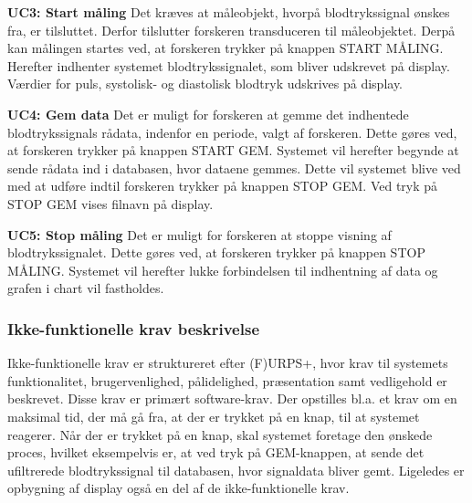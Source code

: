 \textbf{UC3: Start måling}
Det kræves at måleobjekt, hvorpå blodtrykssignal ønskes fra, er tilsluttet. Derfor tilslutter forskeren transduceren til måleobjektet. Derpå kan målingen startes ved, at forskeren trykker på knappen START MÅLING. Herefter indhenter systemet blodtrykssignalet, som bliver udskrevet på display. Værdier for puls, systolisk- og diastolisk blodtryk udskrives på display. 

\textbf{UC4: Gem data}
Det er muligt for forskeren at gemme det indhentede blodtrykssignals rådata, indenfor en periode, valgt af forskeren. Dette gøres ved, at forskeren trykker på knappen START GEM. Systemet vil herefter begynde at sende rådata ind i databasen, hvor dataene gemmes. Dette vil systemet blive ved med at udføre indtil forskeren trykker på knappen STOP GEM. Ved tryk på STOP GEM vises filnavn på display. 

\textbf{UC5: Stop måling}
Det er muligt for forskeren at stoppe visning af blodtrykssignalet. Dette gøres ved, at forskeren trykker på knappen STOP MÅLING. Systemet vil herefter lukke forbindelsen til indhentning af data og grafen i chart vil fastholdes. 

\subsubsection{Ikke-funktionelle krav beskrivelse}
Ikke-funktionelle krav er struktureret efter (F)URPS+, hvor krav til systemets funktionalitet, brugervenlighed, pålidelighed, præsentation samt vedligehold er beskrevet. Disse krav er primært software-krav. Der opstilles bl.a. et krav om en maksimal tid, der må gå fra, at der er trykket på en knap, til at systemet reagerer. Når der er trykket på en knap, skal systemet foretage den ønskede proces, hvilket eksempelvis er, at ved tryk på GEM-knappen, at sende det ufiltrerede blodtrykssignal til databasen, hvor signaldata bliver gemt. Ligeledes er opbygning af display også en del af de ikke-funktionelle krav.